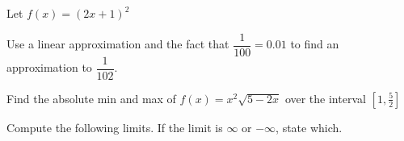 \documentclass[11pt, addpoints]{exam}
\begin{document}
\begin{questions}

\question Let $f(x) = (2x+1)^2$
\addpoints
{}
    \pagebreak

\question Use a linear approximation and the fact that $\dfrac{1}{100}=0.01$ to find an approximation to $\dfrac{1}{102}$.
\vfill

\pagebreak

\question Find the absolute min and max of $f(x) = x^2\sqrt{5-2x}$ over the interval $[1, \frac{5}{2}]$

\pagebreak

\question Compute the following limits. If the limit is $\infty$ or $-\infty$, state which.
\addpoints
{}

\pagebreak


\end{questions}
\end{document}
